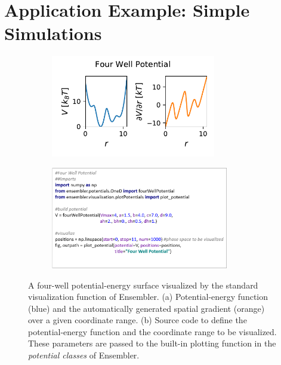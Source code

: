 \section{Application Example: Simple Simulations}



\begin{figure}
	\centering
	\begin{subfigure}{0.45\textwidth}
		\includegraphics[width=\linewidth, height=1.75in]{fig/codeExamples/four_well.pdf} 
		\caption{}
	\end{subfigure}
	\begin{subfigure}{0.45\textwidth}
		\includegraphics[width=\linewidth, height=1.75in]{fig/codeExamples/Potential_code.png}
		\caption{}
	\end{subfigure}
	\caption{A four-well potential-energy surface visualized by the standard visualization function of Ensembler. (a) Potential-energy function (blue) and the automatically generated spatial gradient (orange) over a given coordinate range. (b) Source code to define the potential-energy function and the coordinate range to be visualized. These parameters are passed to the built-in plotting function in the \textit{potential classes} of Ensembler.}
	\label{fig:code_example_potential}
\end{figure}



